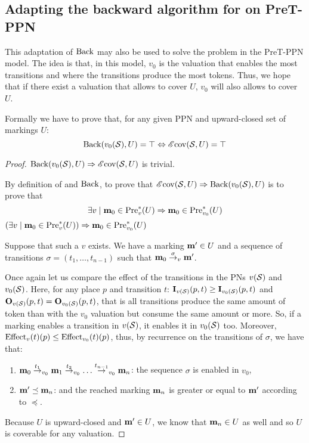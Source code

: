 
\subsection{Adapting the backward algorithm for \Ecov on PreT-\ac{PPN}}

This adaptation of $\operatorname{Back}$ may also be used to solve the \Ecov problem in the PreT-\ac{PPN} model.
The idea is that, in this model, $v_0$ is the valuation that enables the most transitions and where the transitions produce the most tokens.
Thus, we hope that if there exist a valuation that allows to cover $U$, $v_0$ will also allows to cover $U$.

Formally we have to prove that, for any given \ac{PPN} \SPTPm and upward-closed set of markings $U$:
  \[
    \operatorname{Back}(v_0(\mathcal{S}), U) = \top \Leftrightarrow \operatorname{\mathscr{E}cov}(\mathcal{S}, U) = \top
  \]

\begin{proof}
  $\operatorname{Back}(v_0(\mathcal{S}), U) \Rightarrow \operatorname{\mathscr{E}cov}(\mathcal{S}, U)$ is trivial.

  By definition of \Ecov and $\operatorname{Back}$, to prove that $\operatorname{\mathscr{E}cov}(\mathcal{S}, U) \Rightarrow \operatorname{Back}(v_0(\mathcal{S}), U)$ is to prove that
  \[
    \exists v \mid \mathbf{m}_0 \in \operatorname{Pre}^*_{v}(U) \Rightarrow \mathbf{m}_0 \in \operatorname{Pre}^*_{v_0}(U)
  \]
  $ \left( \exists v \mid \mathbf{m}_0 \in \operatorname{Pre}^*_{v}(U) \right) \Rightarrow \mathbf{m}_0 \in \operatorname{Pre}^*_{v_0}(U) $

  Suppose that such a $v$ exists. We have a marking $\mathbf{m'} \in U$ and a sequence of transitions $\sigma = (t_1, \dots, t_{n-1})$ such that $\mathbf{m}_0 \stackrel{\sigma}{\to}_v \mathbf{m'}$.

  Once again let us compare the effect of the transitions in the \acp{PN} $v(\mathcal{S})$ and $v_0(\mathcal{S})$. Here, for any place $p$ and transition $t$: $\mathbf{I}_{v(\mathcal{S})}(p,t) \geq \mathbf{I}_{v_0(\mathcal{S})}(p,t)$ and $\mathbf{O}_{v(\mathcal{S})}(p,t) = \mathbf{O}_{v_0(\mathcal{S})}(p,t)$, that is all transitions produce the same amount of token than with the $v_0$ valuation but consume the same amount or more. So, if a marking enables a transition in $v(\mathcal{S})$, it enables it in $v_0(\mathcal{S})$ too. Moreover, $\operatorname{Effect}_v(t)(p) \leq \operatorname{Effect}_{v_0}(t)(p)$, thus, by recurrence on the transitions of $\sigma$, we have that:
  \begin{enumerate}
    \item $\mathbf{m}_0 \stackrel{t_1}{\to}_{v_0} \mathbf{m}_1 \stackrel{t_2}{\to}_{v_0} \dots \stackrel{t_{n-1}}{\to}_{v_0} \mathbf{m}_n$: the sequence $\sigma$ is enabled in $v_0$,
    \item $\mathbf{m'} \preceq \mathbf{m}_n$: and the reached marking $\mathbf{m}_n$ is greater or equal to $\mathbf{m'}$ according to $\preceq$.
  \end{enumerate}

  Because $U$ is upward-closed and $\mathbf{m'} \in U$, we know that $\mathbf{m}_n \in U$ as well and so $U$ is coverable for any valuation.
\end{proof}

